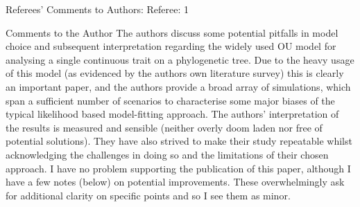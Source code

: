 \documentclass[11pt]{letter}
\begin{document}
\begin{letter}{}

Referees' Comments to Authors:
Referee: 1

Comments to the Author
The authors discuss some potential pitfalls in model choice and subsequent interpretation regarding the widely used OU model for analysing a single continuous trait on a phylogenetic tree. Due to the heavy usage of this model (as evidenced by the authors own literature survey) this is clearly an important paper, and the authors provide a broad array of simulations, which span a sufficient number of scenarios to characterise some major biases of the typical likelihood based model-fitting approach. The authors' interpretation of the results is measured and sensible (neither overly doom laden nor free of potential solutions). They have also strived to make their study repeatable whilst acknowledging the challenges in doing so and the limitations of their chosen approach. I have no problem supporting the publication of this paper, although I have a few notes (below) on potential improvements. These overwhelmingly ask for additional clarity on specific points and so I see them as minor.


\end{letter}
\end{document}

